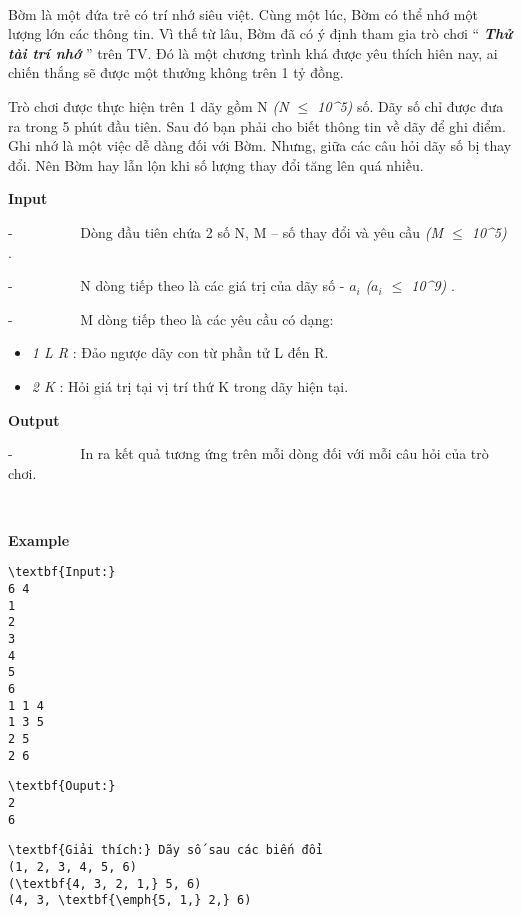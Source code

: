 

 

Bờm là một đứa trẻ có trí nhớ siêu việt. Cùng một lúc, Bờm có thể nhớ một lượng lớn các thông tin. Vì thế từ lâu, Bờm đã có ý định tham gia trò chơi “ \emph{\textbf{ Thử tài trí nhớ }} ” trên TV. Đó là một chương trình khá được yêu thích hiên nay, ai chiến thắng sẽ được một thưởng không trên 1 tỷ đồng.

Trò chơi được thực hiện trên 1 dãy gồm N \emph{ (N $\le$ 10^5) } số. Dãy số chỉ được đưa ra trong 5 phút đầu tiên. Sau đó bạn phải cho biết thông tin về dãy để ghi điểm. Ghi nhớ là một việc dễ dàng đối với Bờm. Nhưng, giữa các câu hỏi dãy số bị thay đổi. Nên Bờm hay lẫn lộn khi số lượng thay đổi tăng lên quá nhiều.

\textbf{Input }

-          Dòng đầu tiên chứa 2 số N, M – số thay đổi và yêu cầu \emph{ (M  $\le$  10^5) } .

-          N dòng tiếp theo là các giá trị của dãy số - $a_{i}$\emph{ ($a_{i}$  $\le$  10^9) } .

-          M dòng tiếp theo là các yêu cầu có dạng:
\begin{itemize}
	\item \emph{1 L R } : Đảo ngược dãy con từ phần tử L đến R.
	\item \emph{2 K } : Hỏi giá trị tại vị trí thứ K trong dãy hiện tại.
\end{itemize}

\textbf{Output }

-          In ra kết quả tương ứng trên mỗi dòng đối với mỗi câu hỏi của trò chơi.

 

\textbf{Example }
\begin{verbatim}
\textbf{Input:}
6 4
1
2
3
4
5
6
1 1 4
1 3 5
2 5
2 6
\end{verbatim}
\begin{verbatim}
\textbf{Ouput:}
2
6\end{verbatim}
\begin{verbatim}
\textbf{Giải thích:} Dãy số sau các biến đổi
(1, 2, 3, 4, 5, 6)
(\textbf{4, 3, 2, 1,} 5, 6)
(4, 3, \textbf{\emph{5, 1,} 2,} 6)\end{verbatim}
